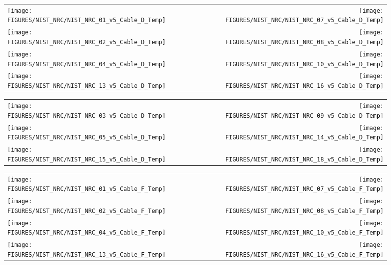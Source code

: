 \begin{figure}[h!]
\begin{tabular*}{\textwidth}{l@{\extracolsep{\fill}}r}
\texttt{[image: FIGURES/NIST\_NRC/NIST\_NRC\_01\_v5\_Cable\_D\_Temp]} &
\texttt{[image: FIGURES/NIST\_NRC/NIST\_NRC\_07\_v5\_Cable\_D\_Temp]} \\
\texttt{[image: FIGURES/NIST\_NRC/NIST\_NRC\_02\_v5\_Cable\_D\_Temp]} &
\texttt{[image: FIGURES/NIST\_NRC/NIST\_NRC\_08\_v5\_Cable\_D\_Temp]} \\
\texttt{[image: FIGURES/NIST\_NRC/NIST\_NRC\_04\_v5\_Cable\_D\_Temp]} &
\texttt{[image: FIGURES/NIST\_NRC/NIST\_NRC\_10\_v5\_Cable\_D\_Temp]} \\
\texttt{[image: FIGURES/NIST\_NRC/NIST\_NRC\_13\_v5\_Cable\_D\_Temp]} &
\texttt{[image: FIGURES/NIST\_NRC/NIST\_NRC\_16\_v5\_Cable\_D\_Temp]}
\end{tabular*}
\label{NIST_NRC_Cable_D_Closed}
\end{figure}

\begin{figure}[h!]
\begin{tabular*}{\textwidth}{l@{\extracolsep{\fill}}r}
\texttt{[image: FIGURES/NIST\_NRC/NIST\_NRC\_03\_v5\_Cable\_D\_Temp]} &
\texttt{[image: FIGURES/NIST\_NRC/NIST\_NRC\_09\_v5\_Cable\_D\_Temp]} \\
\texttt{[image: FIGURES/NIST\_NRC/NIST\_NRC\_05\_v5\_Cable\_D\_Temp]} &
\texttt{[image: FIGURES/NIST\_NRC/NIST\_NRC\_14\_v5\_Cable\_D\_Temp]} \\
\texttt{[image: FIGURES/NIST\_NRC/NIST\_NRC\_15\_v5\_Cable\_D\_Temp]} &
\texttt{[image: FIGURES/NIST\_NRC/NIST\_NRC\_18\_v5\_Cable\_D\_Temp]}
\end{tabular*}
\label{NIST_NRC_Cable_D_Open}
\end{figure}


\begin{figure}[h!]
\begin{tabular*}{\textwidth}{l@{\extracolsep{\fill}}r}
\texttt{[image: FIGURES/NIST\_NRC/NIST\_NRC\_01\_v5\_Cable\_F\_Temp]} &
\texttt{[image: FIGURES/NIST\_NRC/NIST\_NRC\_07\_v5\_Cable\_F\_Temp]} \\
\texttt{[image: FIGURES/NIST\_NRC/NIST\_NRC\_02\_v5\_Cable\_F\_Temp]} &
\texttt{[image: FIGURES/NIST\_NRC/NIST\_NRC\_08\_v5\_Cable\_F\_Temp]} \\
\texttt{[image: FIGURES/NIST\_NRC/NIST\_NRC\_04\_v5\_Cable\_F\_Temp]} &
\texttt{[image: FIGURES/NIST\_NRC/NIST\_NRC\_10\_v5\_Cable\_F\_Temp]} \\
\texttt{[image: FIGURES/NIST\_NRC/NIST\_NRC\_13\_v5\_Cable\_F\_Temp]} &
\texttt{[image: FIGURES/NIST\_NRC/NIST\_NRC\_16\_v5\_Cable\_F\_Temp]}
\end{tabular*}
\label{NIST_NRC_Cable_F_Closed}
\end{figure}

